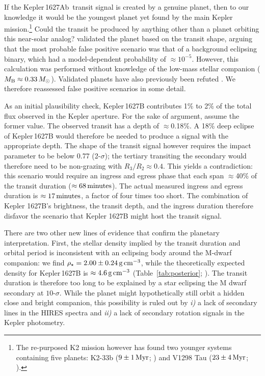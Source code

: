 \documentclass[12pt,modern,twocolumn,tighten]{aastex63}
\newcommand{\pn}{Kepler\,1627Ab} %
\begin{document}
If the \pn\ transit signal is created by a genuine planet,  then to
our knowledge it would be the youngest planet yet found by the main
Kepler mission.\footnote{The re-purposed K2 mission however has found
two younger systems containing five planets: K2-33b ($9\pm1\,{\rm
Myr}$; \citealt{Mann_K2_33b_2016,David_et_al_2017}) and V1298 Tau
($23\pm4\,{\rm Myr}$; \citealt{david_four_2019}).}   Could the transit
be produced by anything other than a planet orbiting this near-solar
analog?  \citet{morton_false_2016} validated the planet based on the
transit shape, arguing that the most probable false positive scenario
was that of a background eclipsing binary, which had a model-dependent
probability of $\approx$$10^{-5}$.  However, this calculation was
performed without knowledge of the low-mass stellar companion ($M_{\rm
B}\approx 0.33\,M_\odot$).  Validated planets have also previously
been refuted \citep[{\it e.g.},][]{shporer_three_2017}.  We therefore
reassessed false positive scenarios in some detail. 


As an initial plausibility check, Kepler\,1627B contributes 1\% to 2\%
of the total flux observed in the Kepler aperture.  For the sake of
argument, assume the former value.  The observed transit has a depth
of $\approx$0.18\%.  A 18\% deep eclipse of Kepler\,1627B would
therefore be needed to produce a signal with the appropriate depth.
The shape of the transit signal however requires the impact parameter
to be below 0.77 (2-$\sigma$); the tertiary transiting the secondary
would therefore need to be non-grazing with $R_3/R_2 \approx 0.4$.
This yields a contradiction:  this scenario would require an ingress
and egress phase that each span $\approx$40\% of the transit duration
($\approx 68\,{\rm minutes}$).  The actual measured ingress and egress
duration is $\approx 17\,{\rm minutes}$, a factor of four times too
short.  The combination of Kepler 1627B's brightness, the transit
depth, and the ingress duration therefore disfavor the scenario that
Kepler 1627B might host the transit signal.  


There are two other new lines of evidence that confirm the planetary
interpretation.  First, the stellar density implied by the transit duration and orbital period
is inconsistent with an eclipsing body around the M-dwarf companion:
we find $\rho_\star = 2.00 \pm 0.24\,{\rm g\,cm}^{-3}$, while the
theoretically expected density for Kepler\,1627B is $\approx 4.6\,{\rm
g\,cm}^{-3}$ (Table~\ref{tab:posterior}; \citealt{choi_mesa_2016}).
The transit duration is therefore too long to be explained by a star
eclipsing the M dwarf secondary at $10$-$\sigma$.  While the planet
might hypothetically still orbit a hidden close and bright companion,
this possibility is ruled out by {\it i)} a lack of secondary lines in
the HIRES spectra and {\it ii)} a lack of secondary rotation signals
in the Kepler photometry.
\end{document}
